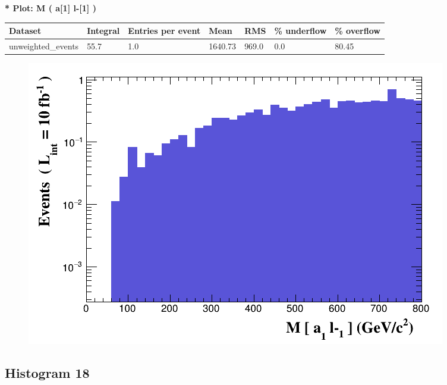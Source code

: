 \documentclass[a4paper, 10pt]{article}
\begin{document}
\textbf{* Plot: M ( a[1] l-[1] ) }\\
   \begin{table}[H]
  \begin{center}
    \begin{tabular}{|m{23.0mm}|m{23.0mm}|m{18.0mm}|m{19.0mm}|m{19.0mm}|m{19.0mm}|m{19.0mm}|}
      \hline
      {\cellcolor{yellow}         Dataset}& {\cellcolor{yellow}         Integral}& {\cellcolor{yellow}         Entries per event}& {\cellcolor{yellow}         Mean}& {\cellcolor{yellow}         RMS}& {\cellcolor{yellow}         \% underflow}& {\cellcolor{yellow}         \% overflow}\\
      \hline
      {\cellcolor{white}         unweighted\_events}& {\cellcolor{white}         55.7}& {\cellcolor{white}         1.0}& {\cellcolor{white}         1640.73}& {\cellcolor{white}         969.0}& {\cellcolor{red}         0.0}& {\cellcolor{red}         80.45}\\
\hline
    \end{tabular}
  \end{center}
\end{table}

\begin{figure}[H]
  \begin{center}
    \includegraphics[scale=0.45]{selection_16.png}\\
\caption{   }
  \end{center}
\end{figure}
      \newpage
\subsection{ Histogram 18}
\end{document}
